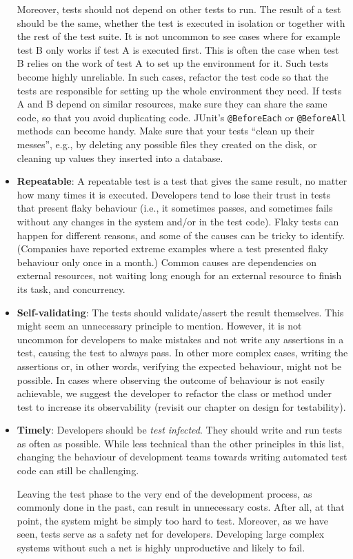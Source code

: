 \begin{itemize}
  Moreover, tests should not depend on other tests to run. The result of
  a test should be the same, whether the test is executed in isolation
  or together with the rest of the test suite. It is not uncommon to see
  cases where for example test B only works if test A is executed first.
  This is often the case when test B relies on the work of test A to set
  up the environment for it. Such tests become highly unreliable. In
  such cases, refactor the test code so that the tests are responsible
  for setting up the whole environment they need. If tests A and B
  depend on similar resources, make sure they can share the same code,
  so that you avoid duplicating code. JUnit's \texttt{@BeforeEach} or
  \texttt{@BeforeAll} methods can become handy. Make sure that your
  tests ``clean up their messes'', e.g., by deleting any possible files
  they created on the disk, or cleaning up values they inserted into a
  database.
\item
  \textbf{Repeatable}: A repeatable test is a test that gives the same
  result, no matter how many times it is executed. Developers tend to
  lose their trust in tests that present flaky behaviour (i.e., it
  sometimes passes, and sometimes fails without any changes in the
  system and/or in the test code). Flaky tests can happen for different
  reasons, and some of the causes can be tricky to identify. (Companies
  have reported extreme examples where a test presented flaky behaviour
  only once in a month.) Common causes are dependencies on external
  resources, not waiting long enough for an external resource to finish
  its task, and concurrency.
\item
  \textbf{Self-validating}: The tests should validate/assert the result
  themselves. This might seem an unnecessary principle to mention.
  However, it is not uncommon for developers to make mistakes and not
  write any assertions in a test, causing the test to always pass. In
  other more complex cases, writing the assertions or, in other words,
  verifying the expected behaviour, might not be possible. In cases
  where observing the outcome of behaviour is not easily achievable, we
  suggest the developer to refactor the class or method under test to
  increase its observability (revisit our chapter on design for
  testability).
\item
  \textbf{Timely}: Developers should be \emph{test infected}. They
  should write and run tests as often as possible. While less technical
  than the other principles in this list, changing the behaviour of
  development teams towards writing automated test code can still be
  challenging.

  Leaving the test phase to the very end of the development process, as
  commonly done in the past, can result in unnecessary costs. After all,
  at that point, the system might be simply too hard to test. Moreover,
  as we have seen, tests serve as a safety net for developers.
  Developing large complex systems without such a net is highly
  unproductive and likely to fail.
\end{itemize}

